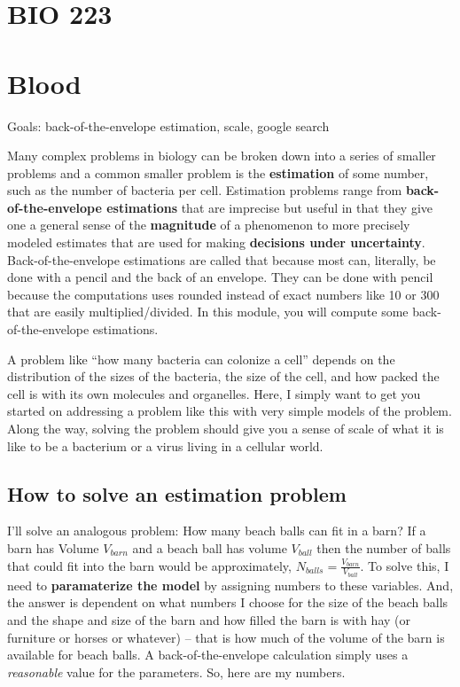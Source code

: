 \documentclass[]{book}
\begin{document}
\chapter*{BIO 223}\label{bio-223}

\chapter{Blood}\label{blood}

Goals: back-of-the-envelope estimation, scale, google search

Many complex problems in biology can be broken down into a series of
smaller problems and a common smaller problem is the \textbf{estimation}
of some number, such as the number of bacteria per cell. Estimation
problems range from \textbf{back-of-the-envelope estimations} that are
imprecise but useful in that they give one a general sense of the
\textbf{magnitude} of a phenomenon to more precisely modeled estimates
that are used for making \textbf{decisions under uncertainty}.
Back-of-the-envelope estimations are called that because most can,
literally, be done with a pencil and the back of an envelope. They can
be done with pencil because the computations uses rounded instead of
exact numbers like 10 or 300 that are easily multiplied/divided. In this
module, you will compute some back-of-the-envelope estimations.

A problem like ``how many bacteria can colonize a cell'' depends on the
distribution of the sizes of the bacteria, the size of the cell, and how
packed the cell is with its own molecules and organelles. Here, I simply
want to get you started on addressing a problem like this with very
simple models of the problem. Along the way, solving the problem should
give you a sense of scale of what it is like to be a bacterium or a
virus living in a cellular world.

\section{How to solve an estimation
problem}\label{how-to-solve-an-estimation-problem}

I'll solve an analogous problem: How many beach balls can fit in a barn?
If a barn has Volume \(V_{barn}\) and a beach ball has volume
\(V_{ball}\) then the number of balls that could fit into the barn would
be approximately, \(N_{balls} = \frac{V_{barn}}{V_{ball}}\). To solve
this, I need to \textbf{paramaterize the model} by assigning numbers to
these variables. And, the answer is dependent on what numbers I choose
for the size of the beach balls and the shape and size of the barn and
how filled the barn is with hay (or furniture or horses or whatever) --
that is how much of the volume of the barn is available for beach balls.
A back-of-the-envelope calculation simply uses a \emph{reasonable} value
for the parameters. So, here are my numbers.
\end{document}

